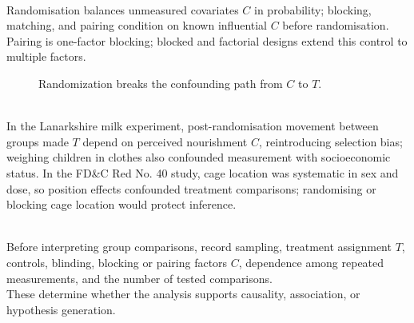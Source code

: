 \begin{principle} \label{prin:randomization-confounding-and-blocking} \\
Randomisation balances unmeasured covariates $C$ in probability; blocking, matching, and pairing condition on known influential $C$ before randomisation. Pairing is one-factor blocking; blocked and factorial designs extend this control to multiple factors.
\end{principle}

\begin{figure}[H]
  \centering
  
  \caption{Randomization breaks the confounding path from $C$ to $T$.}
  \label{fig:randomization-confounding-paths}
\end{figure}

\begin{example} \label{ex:lanarkshire-and-cage-position-design} \\
In the Lanarkshire milk experiment, post-randomisation movement between groups made $T$ depend on perceived nourishment $C$, reintroducing selection bias; weighing children in clothes also confounded measurement with socioeconomic status. In the FD\&C Red No. 40 study, cage location was systematic in sex and dose, so position effects confounded treatment comparisons; randomising or blocking cage location would protect inference.
\end{example}

\begin{remark} \label{rem:comparative-study-checklist} \\
Before interpreting group comparisons, record sampling, treatment assignment $T$, controls, blinding, blocking or pairing factors $C$, dependence among repeated measurements, and the number of tested comparisons.\\
These determine whether the analysis supports causality, association, or hypothesis generation.
\end{remark}
